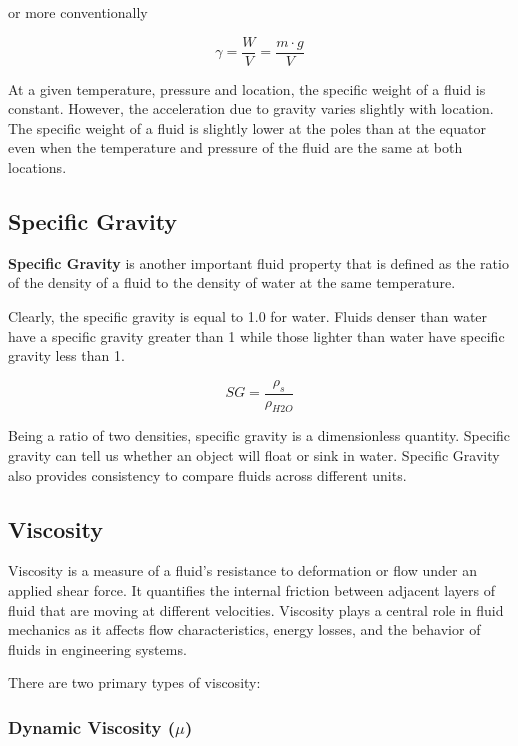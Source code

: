 \documentclass[11pt]{article}
\begin{document}
or more conventionally

\[\gamma = \frac{W}{V} = \frac{m \cdot g}{V}\]

At a given temperature, pressure and location, the specific weight of a
fluid is constant. However, the acceleration due to gravity varies
slightly with location. The specific weight of a fluid is slightly lower
at the poles than at the equator even when the temperature and pressure
of the fluid are the same at both locations.

    \hypertarget{specific-gravity}{%
\subsection{Specific Gravity}\label{specific-gravity}}

\textbf{Specific Gravity} is another important fluid property that is
defined as the ratio of the density of a fluid to the density of water
at the same temperature.

Clearly, the specific gravity is equal to 1.0 for water. Fluids denser
than water have a specific gravity greater than 1 while those lighter
than water have specific gravity less than 1.

\[SG = \frac{\rho_s}{\rho_{H2O}} \]

Being a ratio of two densities, specific gravity is a dimensionless
quantity. Specific gravity can tell us whether an object will float or
sink in water. Specific Gravity also provides consistency to compare
fluids across different units.

    \hypertarget{viscosity}{%
\subsection{Viscosity}\label{viscosity}}

Viscosity is a measure of a fluid's resistance to deformation or flow
under an applied shear force. It quantifies the internal friction
between adjacent layers of fluid that are moving at different
velocities. Viscosity plays a central role in fluid mechanics as it
affects flow characteristics, energy losses, and the behavior of fluids
in engineering systems.

There are two primary types of viscosity:

\hypertarget{dynamic-viscosity-mu}{%
\subsubsection{\texorpdfstring{Dynamic Viscosity
(\(\mu\))}{Dynamic Viscosity (\textbackslash mu)}}\label{dynamic-viscosity-mu}}
\end{document}
